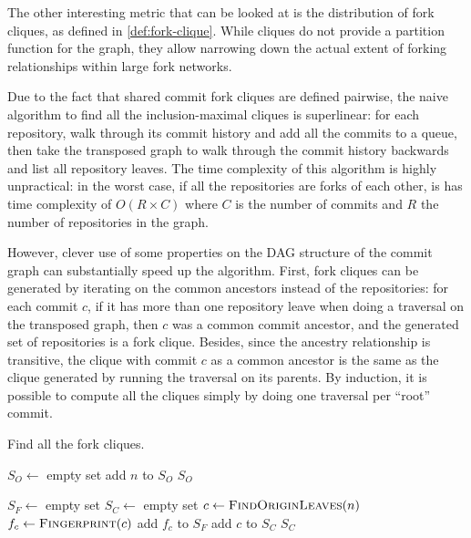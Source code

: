 The other interesting metric that can be looked at is the distribution of fork
cliques, as defined in \cref{def:fork-clique}. While cliques do not
provide a partition function for the graph, they allow narrowing down the
actual extent of forking relationships within large fork networks.

Due to the fact that shared commit fork cliques are defined pairwise, the naive
algorithm to find all the inclusion-maximal cliques is superlinear: for each
repository, walk through its commit history and add all the commits to a queue,
then take the transposed graph to walk through the commit history backwards and
list all repository leaves. The time complexity of this algorithm is highly
unpractical: in the worst case, if all the repositories are forks of each
other, is has time complexity of $O(R \times C)$ where $C$ is the
number of commits and $R$ the number of repositories in the graph.

However, clever use of some properties on the DAG structure of the commit graph
can substantially speed up the algorithm. First, fork cliques can be generated
by iterating on the common ancestors instead of the repositories: for each
commit $c$, if it has more than one repository leave when doing a traversal on
the transposed graph, then $c$ was a common commit ancestor, and the generated
set of repositories is a fork clique. Besides, since the ancestry relationship
is transitive, the clique with commit $c$ as a common ancestor is the same as
the clique generated by running the traversal on its parents. By induction, it
is possible to compute all the cliques simply by doing one traversal per
``root'' commit.

\begin{algorithm}[t]
  \caption{Find all the fork cliques.}%
  \label{algo:fork-clique}
  \begin{algorithmic}
    \State $S_O \gets$ empty set
            \State add $n$ to $S_O$
        \EndIf
    \EndFor
    \State \Return $S_O$
\EndFunction

    \State $S_F \gets$ empty set
    \State $S_C \gets$ empty set
            \State $c \gets \Call{FindOriginLeaves}{n}$
            \State $f_c \gets \Call{Fingerprint}{c}$
                \State add $f_c$ to $S_F$
                \State add $c$ to $S_C$
            \EndIf
        \EndIf
    \EndFor
    \State \Return $S_C$
\EndFunction
\end{algorithmic}
\end{algorithm}

